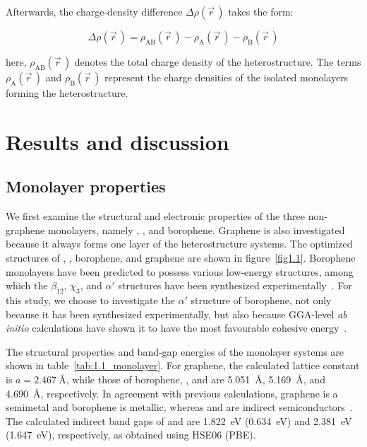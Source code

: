 Afterwards, the charge-density difference $\Delta \rho(\vec{r}\,)$ takes the form:

\begin{equation}
\Delta \rho(\vec{r}\,) =
\rho_{\mathrm{AB}}(\vec{r}\,)
- \rho_{\mathrm{A}}(\vec{r}\,)
- \rho_{\mathrm{B}}(\vec{r}\,)
\label{charge_density_difference}
\end{equation}

here, $\rho_{\mathrm{AB}}(\vec{r}\,)$ denotes the total charge density of the heterostructure.
The terms $\rho_{\mathrm{A}}(\vec{r}\,)$ and $\rho_{\mathrm{B}}(\vec{r}\,)$ represent the charge densities of the isolated monolayers forming the heterostructure.

\section{Results and discussion}
\label{1_results}

\subsection{Monolayer properties}

We first examine the structural and electronic properties of the three non-graphene monolayers,
namely , , and borophene.
Graphene is also investigated because it always forms one layer of the heterostructure systems.
The optimized structures of , , borophene,
and graphene are shown in figure~\ref{fig1.1}.
Borophene monolayers have been predicted to possess various low-energy structures,
among which the $\beta_{12}$, $\chi_{3}$, and $\alpha'$ structures have been synthesized experimentally~\cite{kaneti2021borophene}.
For this study, we choose to investigate the $\alpha'$ structure of borophene,
not only because it has been synthesized experimentally,
but also because GGA-level \textit{ab initio} calculations have shown it to have the most favourable cohesive energy~\cite{wu2012two}.

The structural properties and band-gap energies of the monolayer systems are shown in table~\ref{tab:1.1_monolayer}.
For graphene, the calculated lattice constant is $a = \qty{2.467}{\angstrom}$,
while those of borophene, , and  are \qty{5.051}{\angstrom}, \qty{5.169}{\angstrom}, and \qty{4.690}{\angstrom}, respectively.
In agreement with previous calculations, graphene is a semimetal and borophene is metallic,
whereas  and  are indirect semiconductors~\cite{zhang2018strain, nosheen2022first}.
The calculated indirect band gaps of  and  are \qty{1.822}{\electronvolt} (\qty{0.634}{\electronvolt}) and \qty{2.381}{\electronvolt} (\qty{1.647}{\electronvolt}), respectively, as obtained using HSE06 (PBE).

